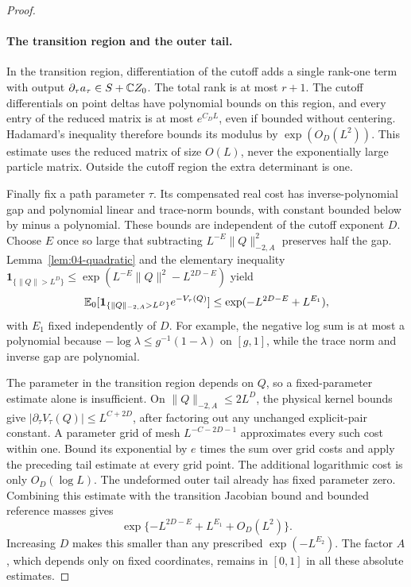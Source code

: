 \begin{proof}
\paragraph{The transition region and the outer tail.}
In the transition region, differentiation of the cutoff adds a single
rank-one term with output \(\partial_\tau a_\tau\in S+\mathbb C Z_0\).
The total rank is at most \(r+1\). The cutoff differentials on point
deltas have polynomial bounds on this region, and every entry of the
reduced matrix is at most \(e^{C_DL}\), even if bounded without
centering. Hadamard's inequality therefore bounds its modulus by
\(\exp(O_D(L^2))\). This estimate uses the reduced matrix of size
\(O(L)\), never the exponentially large particle matrix. Outside
the cutoff region the extra determinant is one.

Finally fix a path parameter \(\tau\). Its compensated real cost has
inverse-polynomial gap and polynomial linear and trace-norm bounds,
with constant bounded below by minus a polynomial. These bounds are
independent of the cutoff exponent \(D\). Choose \(E\) once so large
that subtracting \(L^{-E}\|Q\|_{-2,A}^2\) preserves half the gap.
Lemma~\ref{lem:04-quadratic} and the elementary inequality
\(\mathbf1_{\{\|Q\|>L^D\}}\le
 \exp(L^{-E}\|Q\|^2-L^{2D-E})\) yield
\[
 \mathbb E_0[\mathbf1_{\{\|Q\|_{-2,A}>L^D\}}e^{-V_\tau(Q)}]
 \le \exp(-L^{2D-E}+L^{E_1}),
\]
with \(E_1\) fixed independently of \(D\). For example, the
negative log sum is at most a polynomial because
\(-\log\lambda\le g^{-1}(1-\lambda)\) on \([g,1]\), while the
trace norm and inverse gap are polynomial.

The parameter in the transition region depends on \(Q\), so a
fixed-parameter estimate alone is insufficient. On
\(\|Q\|_{-2,A}\le2L^D\), the physical kernel bounds give
\(|\partial_\tau V_\tau(Q)|\le L^{C+2D}\), after factoring out
any unchanged explicit-pair constant. A parameter grid of mesh
\(L^{-C-2D-1}\) approximates every such cost within one. Bound its
exponential by \(e\) times the sum over grid costs and apply the
preceding tail estimate at every grid point. The additional logarithmic
cost is only \(O_D(\log L)\). The undeformed outer tail already
has fixed parameter zero. Combining this estimate with the transition
Jacobian bound and bounded reference masses gives
\[
 \exp\{-L^{2D-E}+L^{E_1}+O_D(L^2)\}.
\]
Increasing \(D\) makes this smaller than any prescribed
\(\exp(-L^{E_2})\). The factor \(A\), which depends only on fixed
coordinates, remains in \([0,1]\) in all these absolute estimates.
\end{proof}

